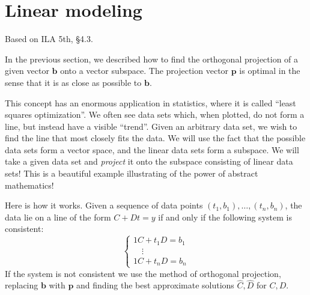 \documentclass[11pt,oneside]{amsbook}
\theoremstyle{definition}
\theoremstyle{plain}
\theoremstyle{definition}
\theoremstyle{remark}
\numberwithin{equation}{section}
\numberwithin{figure}{section}
\begin{document}
\newpage
\section{Linear modeling}

Based on ILA 5th, \S 4.3.

In the previous section, we described how to find the orthogonal projection of a given vector $\mathbf{b}$ onto a vector subspace. The projection vector $\mathbf{p}$ is optimal in the sense that it is as close as possible to $\mathbf{b}$.

This concept has an enormous application in statistics, where it is called ``least squares optimization''. We often see data sets which, when plotted, do not form a line, but instead have a visible ``trend''. Given an arbitrary data set, we wish to find the line that most closely fits the data. We will use the fact that the possible data sets form a vector space, and the linear data sets form a subspace. We will take a given data set and \emph{project} it onto the subspace consisting of linear data sets! This is a beautiful example illustrating of the power of abstract mathematics!

Here is how it works. Given a sequence of data points $(t_1,b_1),\ldots,(t_n,b_n)$, the data lie on a line of the form $C+Dt=y$ if and only if the following system is consistent:
\[\begin{cases}1C+t_1 D=b_1\\\quad\vdots\\1C+t_nD=b_n\end{cases}
\]
If the system is not consistent we use the method of orthogonal projection, replacing $\mathbf{b}$ with $\mathbf{p}$ and finding the best approximate solutions $\hat C,\hat D$ for $C,D$.
\end{document}
